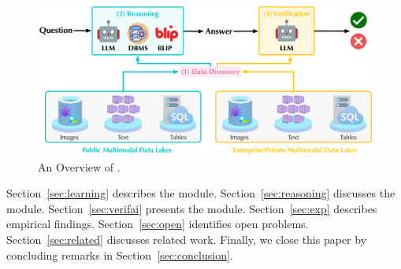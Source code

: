 
\begin{figure}[t!]
\begin{center}
\includegraphics[width=\textwidth]{submissions/Nan2024/figs/mot}
\end{center}
\vspace{-2em}
\caption{An Overview of \sys.}
\label{fig:symphony}
\vspace{-1em}
\end{figure}


Section~\ref{sec:learning} describes the \discovery module.
Section~\ref{sec:reasoning} discusses the \reason module.
Section~\ref{sec:verifai} presents the \verify module.
Section~\ref{sec:exp} describes empirical findings.
Section~\ref{sec:open} identifies open problems.
Section~\ref{sec:related} discusses related work.
Finally, we close this paper by concluding remarks in Section~\ref{sec:conclusion}.
